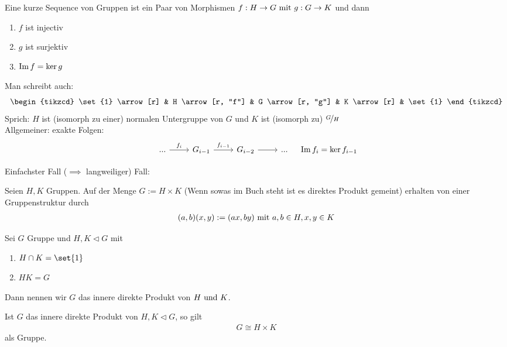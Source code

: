 \begin{definition}
	Eine kurze Sequence von Gruppen ist ein Paar von Morphismen $f: H \to G \mit g: G \to K$ und dann
	\begin{enumerate}
		\item $f$ ist injectiv
		\item $g$ ist surjektiv
		\item $\Image f = \ker g$
	\end{enumerate}
	Man schreibt auch:
		\[
			\begin{tikzcd}
			\set{1} \arrow[r] & H \arrow[r, "f"] & G \arrow[r, "g"] & K \arrow[r] & \set{1}
			\end{tikzcd}
		\]
		Sprich: $H$ ist (isomorph zu einer) normalen Untergruppe von $G$ und $K$ ist (isomorph zu) $\lnkset{G}{H}$\\
		Allgemeiner: exakte Folgen:\\
		\[
			\begin{tikzcd}
			... \arrow[r, "f_i"] & G_{i-1} \arrow[r, "f_{i-1}"] & G_{i-2} \arrow[r] & ...
			\end{tikzcd} \quad \Image f_i = \ker f_{i-1}
		\]
\end{definition}
Einfachster Fall ($\implies$ langweiliger) Fall: 
\begin{definition}
	Seien $H,K$ Gruppen. Auf der Menge $G:= H \times K$ (Wenn sowas im Buch steht ist es direktes Produkt gemeint) erhalten von einer Gruppenstruktur durch
	\begin{align*}
		(a,b)(x,y) := (ax,by) \mit a,b \in H,x,y \in K
	\end{align*}
\end{definition}
\begin{definition}
	Sei $G$ Gruppe und $H,K \lhd G$ mit
	\begin{enumerate}
		\item $H \cap K = \set{1}$ %
		\item $HK = G$
	\end{enumerate}
	Dann nennen wir $G$ das innere direkte Produkt von $H \und K$.
\end{definition}
\begin{proposition}
	Ist $G$ das innere direkte Produkt von $H,K \lhd G$, so gilt 
	\begin{align*}
		G \cong H \times K
	\end{align*}
	als Gruppe.
\end{proposition}

